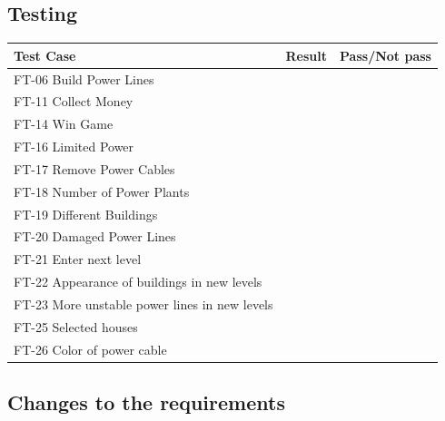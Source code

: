 \subsection{Testing}


	\begin{tabular}{| p{2cm} | p{7cm} | p{3cm} |}
		\hline
		\rowcolor{lightgray}
		{\bf Test Case} & {\bf Result} & {\bf Pass/Not pass} \\ \hline

	  	FT-06 Build Power Lines &  &  \\ \hline

	  	FT-11 Collect Money &  &  \\ \hline

	  	FT-14 Win Game &  &  \\ \hline
	  	
	  	FT-16 Limited Power &  &  \\ \hline
	  	
	  	FT-17 Remove Power Cables &  &  \\ \hline
	  	
	  	FT-18 Number of Power Plants &  &  \\ \hline
	  	
	  	FT-19 Different Buildings &  &  \\ \hline

	  	FT-20 Damaged Power Lines &  &  \\ \hline
	  	
	  	FT-21 Enter next level &  &  \\ \hline

	  	FT-22 Appearance of buildings in new levels &  &  \\ \hline

	  	FT-23 More unstable power lines in new levels &  &  \\ \hline

	  	FT-25 Selected houses &  &  \\ \hline

	  	FT-26 Color of power cable &  &  \\ \hline

	\end{tabular}

\subsection{Changes to the requirements}
	
